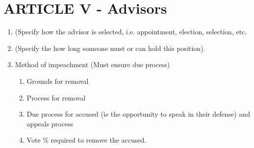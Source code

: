 
 \section{ARTICLE V - Advisors}
 \begin{enumerate}[label=\Alph*.]
   \item	(Specify how the advisor is selected, i.e. appointment, election,
   selection, etc.
   \item (Specify the how long someone must or can hold this position).
   \item Method of impeachment (Must ensure due process)
     \begin{enumerate}[label=\arabic*.]
       \item Grounds for removal
       \item Process for removal
       \item Due process for accused (ie the opportunity to speak in their
       defense) and appeals process
       \item Vote \% required to remove the accused.
     \end{enumerate}
 \end{enumerate}
 
 